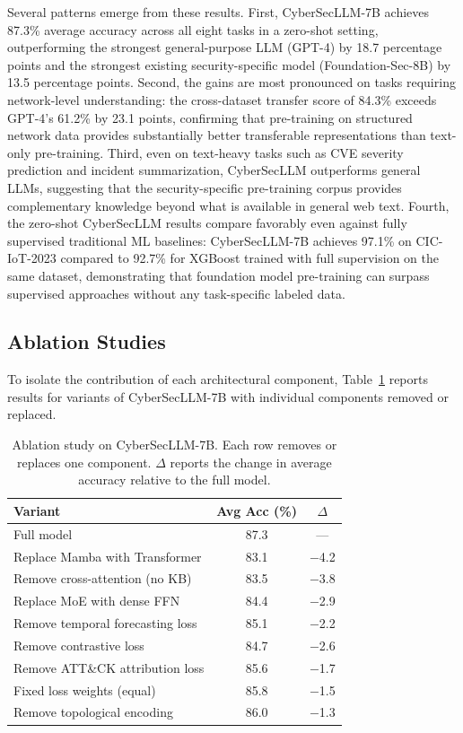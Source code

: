 \documentclass[journal]{IEEEtran}
\newcommand{\modelname}{CyberSecLLM}
\begin{document}
Several patterns emerge from these results. First, \modelname{}-7B achieves 87.3\% average accuracy across all eight tasks in a zero-shot setting, outperforming the strongest general-purpose LLM (GPT-4) by 18.7 percentage points and the strongest existing security-specific model (Foundation-Sec-8B) by 13.5 percentage points. Second, the gains are most pronounced on tasks requiring network-level understanding: the cross-dataset transfer score of 84.3\% exceeds GPT-4's 61.2\% by 23.1 points, confirming that pre-training on structured network data provides substantially better transferable representations than text-only pre-training. Third, even on text-heavy tasks such as CVE severity prediction and incident summarization, \modelname{} outperforms general LLMs, suggesting that the security-specific pre-training corpus provides complementary knowledge beyond what is available in general web text. Fourth, the zero-shot \modelname{} results compare favorably even against fully supervised traditional ML baselines: \modelname{}-7B achieves 97.1\% on CIC-IoT-2023 compared to 92.7\% for XGBoost trained with full supervision on the same dataset, demonstrating that foundation model pre-training can surpass supervised approaches without any task-specific labeled data.

\subsection{Ablation Studies}
\label{subsec:ablation}

To isolate the contribution of each architectural component, Table~\ref{tab:ablation} reports results for variants of \modelname{}-7B with individual components removed or replaced.

\begin{table}[!t]
\centering
\caption{Ablation study on \modelname{}-7B. Each row removes or replaces one component. $\Delta$ reports the change in average accuracy relative to the full model.}
\label{tab:ablation}
\renewcommand{\arraystretch}{1.1}
\begin{tabular}{lcc}
\toprule
\textbf{Variant} & \textbf{Avg Acc (\%)} & $\Delta$ \\
\midrule
Full model                          & 87.3 & --- \\
\midrule
Replace Mamba with Transformer      & 83.1 & $-$4.2 \\
Remove cross-attention (no KB)      & 83.5 & $-$3.8 \\
Replace MoE with dense FFN          & 84.4 & $-$2.9 \\
Remove temporal forecasting loss    & 85.1 & $-$2.2 \\
Remove contrastive loss             & 84.7 & $-$2.6 \\
Remove ATT\&CK attribution loss    & 85.6 & $-$1.7 \\
Fixed loss weights (equal)          & 85.8 & $-$1.5 \\
Remove topological encoding         & 86.0 & $-$1.3 \\
\bottomrule
\end{tabular}
\end{table}
\end{document}
